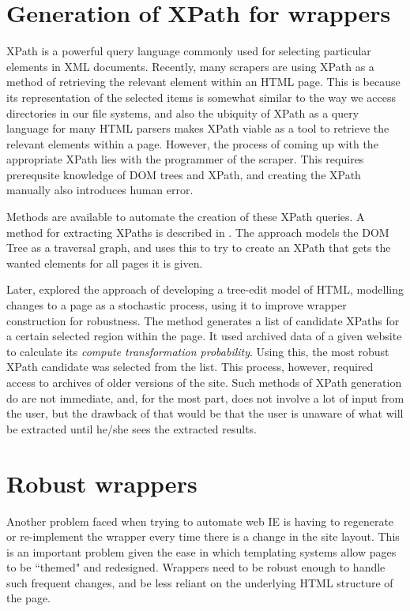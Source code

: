 \section{Generation of XPath for wrappers}
XPath is a powerful query language commonly used for selecting particular elements in XML
documents. Recently, many scrapers are using XPath as a method of retrieving the relevant
element within an HTML page. This is because its representation of the selected items is
somewhat similar to the way we access directories in our file systems, and also the ubiquity of
XPath as a query language for many HTML parsers makes XPath viable as a tool to retrieve the
relevant elements within a page. However, the process of coming up with the appropriate XPath
lies with the programmer of the scraper. This requires prerequsite knowledge of DOM trees and
XPath, and creating the XPath manually also introduces human error.
	
Methods are available to automate the creation of these XPath queries. A method for extracting
XPaths is described in \cite{Anton2004}. The approach models the DOM Tree as a traversal graph,
and uses this to try to create an XPath that gets the wanted elements for all pages it is given.

Later, \cite{Dalvi2009} explored the approach of developing a tree-edit model of HTML,
modelling changes to a page as a stochastic process, using it to improve wrapper construction
for robustness. The method generates a list of candidate XPaths for a certain selected region
within the page. It used archived data of a given website to calculate its \textit{compute
transformation probability}. Using this, the most robust XPath candidate was selected from the
list. This process, however, required access to archives of older versions of the site. Such
methods of XPath generation do are not immediate, and, for the most part, does not involve a
lot of input from the user, but the drawback of that would be that the user is unaware of what
will be extracted until he/she sees the extracted results.

\section{Robust wrappers}
Another problem faced when trying to automate web IE is having to regenerate or re-implement
the wrapper every time there is a change in the site layout. This is an important problem given
the ease in which templating systems allow pages to be ``themed" and redesigned. Wrappers need
to be robust enough to handle such frequent changes, and be less reliant on the underlying HTML
structure of the page.
	

